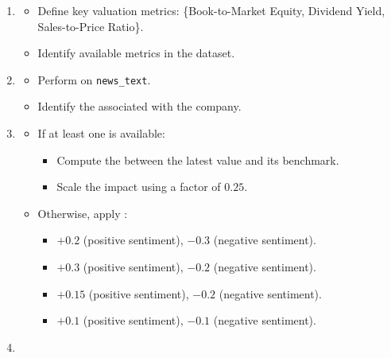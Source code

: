 \documentclass[3p,times,procedia]{elsarticle}
\begin{document}
\begin{enumerate}
    \item {}
    \begin{itemize}
        \item Define key valuation metrics: 
        \{Book-to-Market Equity, Dividend Yield, Sales-to-Price Ratio\}.
        \item Identify available metrics in the dataset.
    \end{itemize}

    \item {}
    \begin{itemize}
        \item Perform  on \texttt{news\_text}.
        \item Identify the  associated with the company.
    \end{itemize}

    \item {}
    \begin{itemize}
        \item If at least one  is available:
        \begin{itemize}
            \item Compute the  between the latest value and its benchmark.
            \item Scale the impact using a factor of $0.25$.
        \end{itemize}
        \item Otherwise, apply :
        \begin{itemize}
            \item {} $+0.2$ (positive sentiment), $-0.3$ (negative sentiment).
            \item {} $+0.3$ (positive sentiment), $-0.2$ (negative sentiment).
            \item {} $+0.15$ (positive sentiment), $-0.2$ (negative sentiment).
            \item {} $+0.1$ (positive sentiment), $-0.1$ (negative sentiment).
        \end{itemize}
    \end{itemize}

    \item {}
\end{enumerate}
\end{document}
